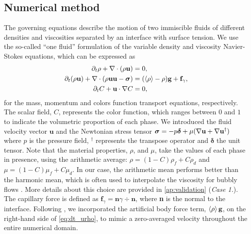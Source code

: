 \subsection{Numerical method}
The governing equations describe the motion of two immiscible fluids of different densities and viscosities separated by an interface with surface tension. 
We use the so-called ``one fluid'' formulation of the variable density and viscosity Navier-Stokes equations, which can be expressed as \citep{tryggvason2011direct}
\begin{align}
    \partial_t \rho+ \mathbf{\nabla}\cdot(\rho\textbf{u})
    &= 0,\\
    \label{eq:dt_urho}
    \partial_t (\rho \textbf{u})
    + \mathbf{\nabla}\cdot (\rho  \textbf{u} \textbf{u} - \bm\sigma)
    &= (\left<\rho\right> - \rho)\textbf{g}
    + \textbf{f}_\gamma,\\
    \label{eq:dt_C}
    \partial_t C + \textbf{u}\cdot\mathbf{\nabla} C  
    &= 0,
\end{align}
for the mass, momentum and colors function transport equations, respectively. 
The scalar field, $C$, represents the color function, which ranges between $0$ and $1$ to indicate the volumetric proportion of each phase.
We introduced the fluid velocity vector $\textbf{u}$ and the Newtonian stress tensor $\bm{\sigma} = -p \bm\delta + \mu (\mathbf{\nabla} \textbf{u}+ \mathbf{\nabla} \textbf{u}^\dagger)$ where $p$ is the pressure field, $^\dagger$ represents the transpose operator and $\bm\delta$ the unit tensor.
Note that the material properties, $\rho$, and $\mu$, take the values of each phase in presence, using the arithmetic average: $\rho = (1-C)\rho_f + C \rho_d$ and $\mu = (1-C)\mu_f + C \mu_d$. 
In our case, the arithmetic mean performs better than the harmonic mean, which is often used to interpolate the viscosity for bubbly flows \citet{hidman2023assessing,innocenti2020direct}.
More details about this choice are provided in \ref{ap:validation} (\textit{Case 1.}). 
The capillary force is defined as $\textbf{f}_\gamma =\textbf{n} \gamma \div \textbf{n} $, where \textbf{n} is the normal to the interface.
Following  \citep{bunner2002dynamics}, we incorporated the artificial body force term, $\left<\rho\right>\textbf{g}$, on the right-hand side of \ref{eq:dt_urho}, to mimic a zero-averaged velocity throughout the entire numerical domain.  

